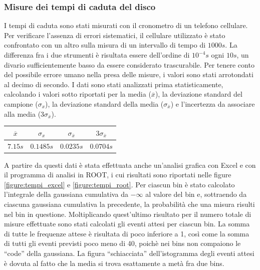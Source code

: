 \documentclass{article}
\newcommand{\quotes}[1]{``#1''}
\begin{document}
\subsubsection{Misure dei tempi di caduta del disco}
I tempi di caduta sono stati misurati con il cronometro di un telefono cellulare. Per verificare l'assenza di errori sistematici, il cellulare utilizzato è stato confrontato con un altro sulla misura di un intervallo di tempo di $1000s$. La differenza fra i due strumenti è risultata essere dell'ordine di $10^{-4}s$ ogni $10s$, un divario sufficientemente basso da essere considerato trascurabile. Per tenere conto del possibile errore umano nella presa delle misure, i valori sono stati arrotondati al decimo di secondo. I dati sono stati analizzati prima statisticamente, calcolando i valori sotto riportati per la media ($\overline{x}$), la deviazione standard del campione ($\sigma_{x}$), la deviazione standard della media ($\sigma_{\overline{x}}$) e l'incertezza da associare alla media ($3\sigma_{\overline{x}}$).

\begin{center}
\begin{tabular}{|c|c|c|c|}
\hline
$\overline{x}$ & $\sigma_{x}$ & $\sigma_{\overline{x}}$ & $3\sigma_{\overline{x}}$ \\
\hline
$7.15s$ & $0.1485s$ & $0.0235s$ & $0.0704s$ \\
\hline
\end{tabular}
\end{center}

A partire da questi dati è stata effettuata anche un'analisi grafica con Excel e con il programma di analisi in ROOT, i cui risultati sono riportati nelle figure \ref{figure:tempi_excel} e \ref{figure:tempi_root}. Per ciascun bin è stato calcolato l'integrale della gaussiana cumulativa da $-\infty$ al valore del bin e, sottraendo da ciascuna gaussiana cumulativa la precedente, la probabilità che una misura risulti nel bin in questione. Moltiplicando quest'ultimo risultato per il numero totale di misure effettuate sono stati calcolati gli eventi attesi per ciascun bin. La somma di tutte le frequenze attese è risultata di poco inferiore a 1, così come la somma di tutti gli eventi previsti poco meno di 40, poichè nei bins non compaiono le \quotes{code} della gaussiana.
La figura \quotes{schiacciata} dell'istogramma degli eventi attesi è dovuta al fatto che la media si trova esattamente a metà fra due bins.
\end{document}
